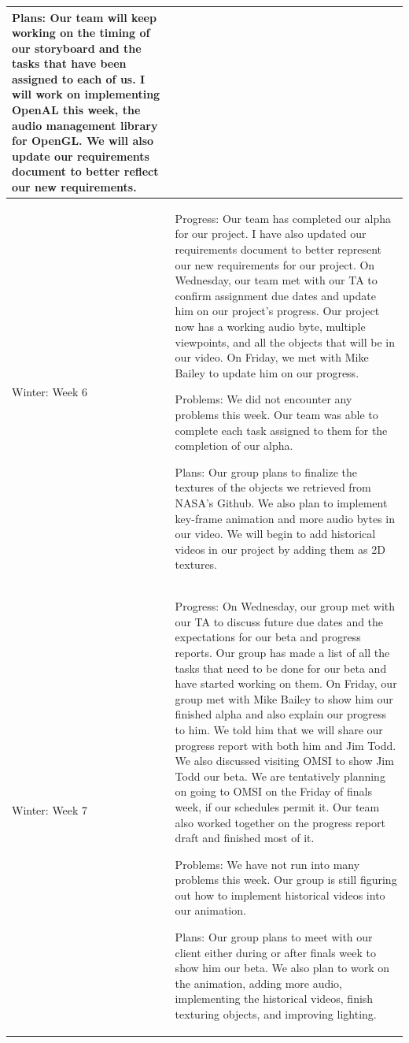 \documentclass[onecolumn, draftclsnofoot,10pt, compsoc]{IEEEtran}
\begin{document}
\begin{longtable} {|p{1.5cm}|p{13.5cm}|}
Plans: Our team will keep working on the timing of our storyboard and the tasks that have been assigned to each of us. I will work on implementing OpenAL this week, the audio management library for OpenGL. We will also update our requirements document to better reflect our new requirements.
\\ \hline

Winter: Week 6 & 
Progress: Our team has completed our alpha for our project. I have also updated our requirements document to better represent our new requirements for our project. On Wednesday, our team met with our TA to confirm assignment due dates and update him on our project's progress. Our project now has a working audio byte, multiple viewpoints, and all the objects that will be in our video. On Friday, we met with Mike Bailey to update him on our progress. 

Problems: We did not encounter any problems this week. Our team was able to complete each task assigned to them for the completion of our alpha.

Plans: Our group plans to finalize the textures of the objects we retrieved from NASA's Github. We also plan to implement key-frame animation and more audio bytes in our video. We will begin to add historical videos in our project by adding them as 2D textures.
\\ \hline

Winter: Week 7 & 
Progress: On Wednesday, our group met with our TA to discuss future due dates and the expectations for our beta and progress reports. Our group has made a list of all the tasks that need to be done for our beta and have started working on them. On Friday, our group met with Mike Bailey to show him our finished alpha and also explain our progress to him. We told him that we will share our progress report with both him and Jim Todd. We also discussed visiting OMSI to show Jim Todd our beta. We are tentatively planning on going to OMSI on the Friday of finals week, if our schedules permit it. Our team also worked together on the progress report draft and finished most of it.

Problems: We have not run into many problems this week. Our group is still figuring out how to implement historical videos into our animation.

Plans: Our group plans to meet with our client either during or after finals week to show him our beta. We also plan to work on the animation, adding more audio, implementing the historical videos, finish texturing objects, and improving lighting.
\\ \hline


\end{longtable}
\end{document}
